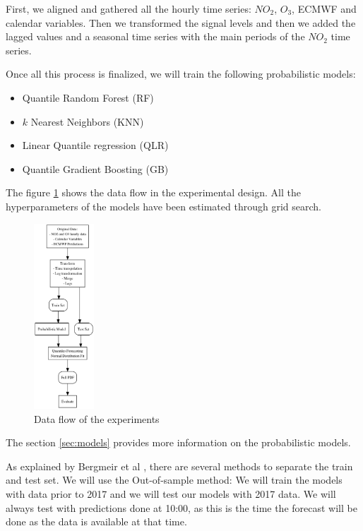 \documentclass[a4paper,twocolumn,5p]{elsarticle}
\begin{document}
First, we aligned and gathered all the hourly time series: $NO_2$, $O_3$, ECMWF and calendar variables.
Then we transformed the signal levels and then we added the lagged values 
and a seasonal time series with the 
main periods of the $NO_2$ time series. 

Once all this process is finalized, 
we will train the following probabilistic 
models:
\begin{itemize}
  \item Quantile Random Forest (RF)
  \item $k$ Nearest Neighbors (KNN)
  \item Linear Quantile regression (QLR)
  \item Quantile Gradient Boosting (GB)
\end{itemize}

The figure \ref{figure:dataflow} shows the data 
flow in the experimental design. All the hyperparameters 
of the models have been estimated through grid search. 

\begin{figure}
  \centering
  \includegraphics[width=0.2\textwidth]{diagrams/flow}
  \caption{Data flow of the experiments}
  \label{figure:dataflow}
\end{figure}

The section \ref{sec:models} provides more information on the probabilistic models.

As explained by Bergmeir et al \cite{bergmeir_note_2018}, there are several methods
to separate the train and test set. We will use the Out-of-sample method:
We will train the models with data prior to 2017 and we will test our 
models with 2017 data. We will always test with 
predictions done at 10:00, as this is the time the 
forecast will be done as the data is available at that time.
\end{document}
